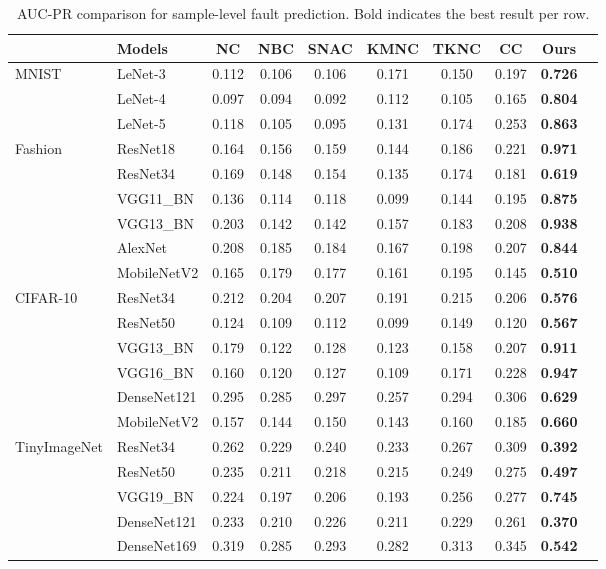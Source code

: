 \documentclass[preprint,number,5p,twocolumn]{elsarticle}
\begin{document}
\begin{table}[htbp]
  \centering
  \caption{AUC-PR comparison for sample-level fault prediction. Bold indicates the best result per row.}\label{tab:auc-pr}
  \scriptsize
  \begin{tabular}{l|lcccccccc}
    \toprule
    & \textbf{Models} & \textbf{NC} & \textbf{NBC} & \textbf{SNAC} & \textbf{KMNC} & \textbf{TKNC} & \textbf{CC} & \textbf{Ours} \\
    \midrule
    \multirow{3}{*}{MNIST}
      & LeNet-3    & 0.112 & 0.106 & 0.106 & 0.171 & 0.150 & 0.197 & \textbf{0.726} \\
      & LeNet-4    & 0.097 & 0.094 & 0.092 & 0.112 & 0.105 & 0.165 & \textbf{0.804} \\
      & LeNet-5    & 0.118 & 0.105 & 0.095 & 0.131 & 0.174 & 0.253 & \textbf{0.863} \\
    \midrule
    \multirow{6}{*}{Fashion}
      & ResNet18    & 0.164 & 0.156 & 0.159 & 0.144 & 0.186 & 0.221 & \textbf{0.971} \\
      & ResNet34    & 0.169 & 0.148 & 0.154 & 0.135 & 0.174 & 0.181 & \textbf{0.619} \\
      & VGG11\_BN   & 0.136 & 0.114 & 0.118 & 0.099 & 0.144 & 0.195 & \textbf{0.875} \\
      & VGG13\_BN   & 0.203 & 0.142 & 0.142 & 0.157 & 0.183 & 0.208 & \textbf{0.938} \\
      & AlexNet     & 0.208 & 0.185 & 0.184 & 0.167 & 0.198 & 0.207 & \textbf{0.844} \\
      & MobileNetV2 & 0.165 & 0.179 & 0.177 & 0.161 & 0.195 & 0.145 & \textbf{0.510} \\
    \midrule
    \multirow{6}{*}{CIFAR-10}
      & ResNet34    & 0.212 & 0.204 & 0.207 & 0.191 & 0.215 & 0.206 & \textbf{0.576} \\
      & ResNet50    & 0.124 & 0.109 & 0.112 & 0.099 & 0.149 & 0.120 & \textbf{0.567} \\
      & VGG13\_BN   & 0.179 & 0.122 & 0.128 & 0.123 & 0.158 & 0.207 & \textbf{0.911} \\
      & VGG16\_BN   & 0.160 & 0.120 & 0.127 & 0.109 & 0.171 & 0.228 & \textbf{0.947} \\
      & DenseNet121 & 0.295 & 0.285 & 0.297 & 0.257 & 0.294 & 0.306 & \textbf{0.629} \\
      & MobileNetV2 & 0.157 & 0.144 & 0.150 & 0.143 & 0.160 & 0.185 & \textbf{0.660} \\
    \midrule
    \multirow{5}{*}{TinyImageNet}
      & ResNet34    & 0.262 & 0.229 & 0.240 & 0.233 & 0.267 & 0.309 & \textbf{0.392} \\
      & ResNet50    & 0.235 & 0.211 & 0.218 & 0.215 & 0.249 & 0.275 & \textbf{0.497} \\
      & VGG19\_BN   & 0.224 & 0.197 & 0.206 & 0.193 & 0.256 & 0.277 & \textbf{0.745} \\
      & DenseNet121 & 0.233 & 0.210 & 0.226 & 0.211 & 0.229 & 0.261 & \textbf{0.370} \\
      & DenseNet169 & 0.319 & 0.285 & 0.293 & 0.282 & 0.313 & 0.345 & \textbf{0.542} \\
    \bottomrule
  \end{tabular}
\end{table}
\end{document}
